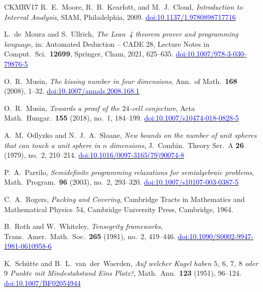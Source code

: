 \documentclass[11pt,reqno]{amsart}
\newcommand{\bluelink}[2]{\href{#1}{\textcolor{blue}{#2}}}
\renewcommand{\_}{\origunderscore\allowbreak}
\numberwithin{equation}{section}
\theoremstyle{plain}
\theoremstyle{definition}
\theoremstyle{remark}
\begin{document}
\begin{thebibliography}{CKMRV17}
R.~E.~Moore, R.~B.~Kearfott, and M.~J.~Cloud,
\textit{Introduction to Interval Analysis},
SIAM, Philadelphia, 2009.
\bluelink{https://doi.org/10.1137/1.9780898717716}{doi:10.1137/1.9780898717716}

L.~de~Moura and S.~Ullrich,
\textit{The {L}ean~4 theorem prover and programming language},
in: Automated Deduction -- CADE 28, Lecture Notes in Comput.\ Sci.\ \textbf{12699},
Springer, Cham, 2021, 625--635.
\bluelink{https://doi.org/10.1007/978-3-030-79876-5_37}{doi:10.1007/978-3-030-79876-5\_37}

O.~R.~Musin,
\textit{The kissing number in four dimensions},
Ann.\ of Math.\ \textbf{168} (2008), 1--32.
\bluelink{https://doi.org/10.4007/annals.2008.168.1}{doi:10.4007/annals.2008.168.1}

O.~R.~Musin,
\textit{Towards a proof of the $24$-cell conjecture},
Acta Math.\ Hungar.\ \textbf{155} (2018), no.~1, 184--199.
\bluelink{https://doi.org/10.1007/s10474-018-0828-5}{doi:10.1007/s10474-018-0828-5}

A.~M.~Odlyzko and N.~J.~A.~Sloane,
\textit{New bounds on the number of unit spheres that can touch a unit sphere in $n$ dimensions},
J.\ Combin.\ Theory Ser.\ A \textbf{26} (1979), no.~2, 210--214.
\bluelink{https://doi.org/10.1016/0097-3165(79)90074-8}{doi:10.1016/0097-3165(79)90074-8}

P.~A.~Parrilo,
\textit{Semidefinite programming relaxations for semialgebraic problems},
Math.\ Program.\ \textbf{96} (2003), no.~2, 293--320.
\bluelink{https://doi.org/10.1007/s10107-003-0387-5}{doi:10.1007/s10107-003-0387-5}

C.~A.~Rogers,
\textit{Packing and Covering},
Cambridge Tracts in Mathematics and Mathematical Physics~54,
Cambridge University Press, Cambridge, 1964.

B.~Roth and W.~Whiteley,
\textit{Tensegrity frameworks},
Trans.\ Amer.\ Math.\ Soc.\ \textbf{265} (1981), no.~2, 419--446.
\bluelink{https://doi.org/10.1090/S0002-9947-1981-0610958-6}{doi:10.1090/S0002-9947-1981-0610958-6}

K.~Sch\"utte and B.~L.~van~der~Waerden,
\textit{Auf welcher Kugel haben $5$, $6$, $7$, $8$ oder $9$ Punkte mit
Mindestabstand Eins Platz?},
Math.\ Ann.\ \textbf{123} (1951), 96--124.
\bluelink{https://doi.org/10.1007/BF02054944}{doi:10.1007/BF02054944}


\end{thebibliography}
\end{document}
